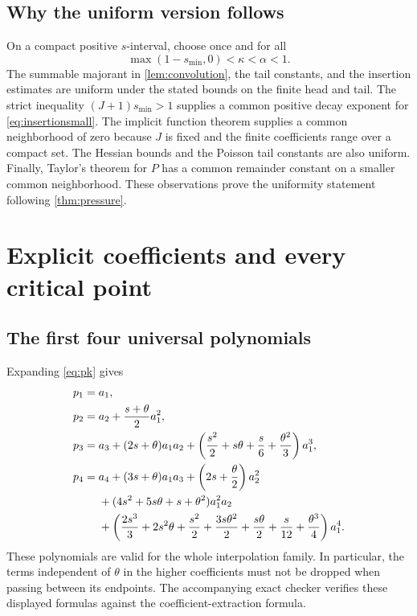 \documentclass[11pt,a4paper]{article}
\theoremstyle{definition}
\theoremstyle{remark}
\numberwithin{equation}{section}
\begin{document}
\subsection{Why the uniform version follows}
On a compact positive $s$-interval, choose once and for all
\[
 \max(1-s_{\min},0)<\kappa<\alpha<1.
\]
The summable majorant in \cref{lem:convolution}, the tail constants,
and the insertion estimates are uniform under the stated bounds on the
finite head and tail. The strict inequality $(J+1)s_{\min}>1$ supplies
a common positive decay exponent for \eqref{eq:insertionsmall}.
The implicit function theorem supplies a common neighborhood of zero
because $J$ is fixed and the finite coefficients range over a compact
set. The Hessian bounds and the Poisson tail constants are also
uniform. Finally, Taylor's theorem for $P$ has a common remainder
constant on a smaller common neighborhood. These observations prove
the uniformity statement following \cref{thm:pressure}.

\section{Explicit coefficients and every critical point}\label{sec:coefficients}

\subsection{The first four universal polynomials}
Expanding \eqref{eq:pk} gives
\begin{align}
 p_1={}&a_1,\label{eq:p1}\\
 p_2={}&a_2+\frac{s+\theta}{2}a_1^2,\label{eq:p2}\\
 p_3={}&a_3+(2s+\theta)a_1a_2
 +\left(\frac{s^2}{2}+s\theta+\frac{s}{6}
                  +\frac{\theta^2}{3}\right)a_1^3,\label{eq:p3}\\
 p_4={}&a_4+(3s+\theta)a_1a_3
       +\left(2s+\frac\theta2\right)a_2^2\notag\\
 &+(4s^2+5s\theta+s+\theta^2)a_1^2a_2\notag\\
 &+\left(\frac{2s^3}{3}+2s^2\theta+\frac{s^2}{2}
       +\frac{3s\theta^2}{2}+\frac{s\theta}{2}
       +\frac{s}{12}+\frac{\theta^3}{4}\right)a_1^4.
 \label{eq:p4}
\end{align}
These polynomials are valid for the whole interpolation family. In
particular, the terms independent of $\theta$ in the higher
coefficients must not be dropped when passing between its endpoints.
The accompanying exact checker verifies these displayed formulas
against the coefficient-extraction formula.
\end{document}
